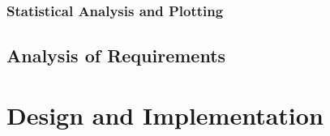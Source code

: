 \documentclass{report}
\begin{document}

\subsection{Statistical Analysis and Plotting}



\section{Analysis of Requirements}




\chapter{Design and Implementation}  %
\end{document}
